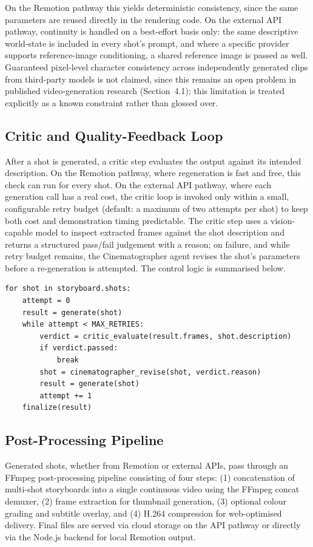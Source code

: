 \documentclass[11pt,a4paper]{article}
\begin{document}
On the Remotion pathway this yields deterministic consistency, since the same parameters are reused directly in the rendering code. On the external API pathway, continuity is handled on a best-effort basis only: the same descriptive world-state is included in every shot's prompt, and where a specific provider supports reference-image conditioning, a shared reference image is passed as well. Guaranteed pixel-level character consistency across independently generated clips from third-party models is not claimed, since this remains an open problem in published video-generation research (Section~4.1); this limitation is treated explicitly as a known constraint rather than glossed over.

\subsection{Critic and Quality-Feedback Loop}

After a shot is generated, a critic step evaluates the output against its intended description. On the Remotion pathway, where regeneration is fast and free, this check can run for every shot. On the external API pathway, where each generation call has a real cost, the critic loop is invoked only within a small, configurable retry budget (default: a maximum of two attempts per shot) to keep both cost and demonstration timing predictable. The critic step uses a vision-capable model to inspect extracted frames against the shot description and returns a structured pass/fail judgement with a reason; on failure, and while retry budget remains, the Cinematographer agent revises the shot's parameters before a re-generation is attempted. The control logic is summarised below.

\begin{verbatim}
for shot in storyboard.shots:
    attempt = 0
    result = generate(shot)
    while attempt < MAX_RETRIES:
        verdict = critic_evaluate(result.frames, shot.description)
        if verdict.passed:
            break
        shot = cinematographer_revise(shot, verdict.reason)
        result = generate(shot)
        attempt += 1
    finalize(result)
\end{verbatim}

\subsection{Post-Processing Pipeline}

Generated shots, whether from Remotion or external APIs, pass through an FFmpeg post-processing pipeline consisting of four steps: (1) concatenation of multi-shot storyboards into a single continuous video using the FFmpeg concat demuxer, (2) frame extraction for thumbnail generation, (3) optional colour grading and subtitle overlay, and (4) H.264 compression for web-optimised delivery. Final files are served via cloud storage on the API pathway or directly via the Node.js backend for local Remotion output.
\end{document}
